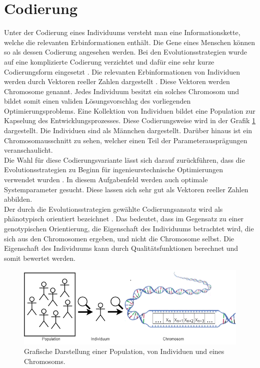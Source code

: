 \section{Codierung}
Unter der Codierung eines Individuums versteht man eine Informationskette, welche die relevanten Erbinformationen enthält.
Die Gene eines Menschen können so als dessen Codierung angesehen werden.
Bei den Evolutionsstrategien wurde auf eine komplizierte Codierung verzichtet und dafür eine sehr kurze Codierungsform eingesetzt \cite[S.147]{schoeneburg}. Die relevanten Erbinformationen von Individuen werden durch Vektoren reeller Zahlen dargestellt \cite[S.147]{schoeneburg}. Diese Vektoren werden Chromosome genannt. Jedes Individuum besitzt ein solches Chromosom und bildet somit einen validen Lösungsvorschlag des vorliegenden Optimierungsproblems.
Eine Kollektion von Individuen bildet eine Population zur Kapselung des Entwicklungsprozesses. Diese Codierungsweise wird in der Grafik \ref{fig:codierung} dargestellt. Die Individuen sind als Männchen dargestellt. Darüber hinaus ist ein Chromosomausschnitt zu sehen, welcher einen Teil der Parameterausprägungen veranschaulicht.\\
Die Wahl für diese Codierungsvariante lässt sich darauf zurückführen, dass die Evolutionsstrategien zu Beginn für ingenieurstechnische Optimierungen verwendet wurden \cite[S.147]{schoeneburg}.
In diesem Aufgabenfeld werden auch optimale Systemparameter gesucht. Diese lassen sich sehr gut als Vektoren reeller Zahlen abbilden.\\
Der durch die Evolutionsstrategien gewählte Codierungsansatz wird als phänotypisch orientiert bezeichnet \cite[S.148]{schoeneburg}. Das bedeutet, dass im Gegensatz zu einer genotypischen Orientierung, die Eigenschaft des Individuums betrachtet wird, die sich aus den Chromosomen ergeben, und nicht die Chromosome selbst.
Die Eigenschaft des Individuums kann durch Qualitätsfunktionen berechnet und somit bewertet werden.

\begin{figure}[!htb]
	\centering
	\includegraphics[width=1.\textwidth]{img/codierung/codierung.png}
	\caption{Grafische Darstellung einer Population, von Individuen und eines Chromosoms.}
\label{fig:codierung}
\end{figure}
